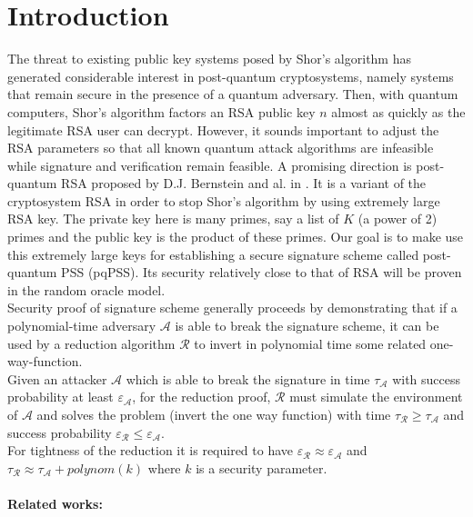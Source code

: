 \documentclass[a4paper,11pt]{article}
\begin{document}
\section{Introduction}
The threat to existing public key systems posed by Shor's \cite{Shor} algorithm has generated considerable interest in post-quantum cryptosystems, namely systems that remain secure in the presence of a quantum adversary. Then, with quantum computers, Shor's algorithm factors an RSA public key $n$ almost as quickly as the legitimate RSA user can decrypt. However, it sounds important to adjust the RSA parameters so that all known quantum attack algorithms are infeasible while signature and verification remain feasible.  A promising direction is post-quantum RSA proposed by D.J. Bernstein and al. in \cite{pqRSA}. It is a variant of the cryptosystem RSA in order to stop Shor's algorithm by using extremely large RSA key. The private key here is many primes, say a list of $K$ (a power of 2) primes and the public key is the product of these primes. Our goal is to make use this extremely large keys for establishing a secure signature scheme called post-quantum PSS (pqPSS). Its security relatively close to that of RSA will be proven in the random oracle model.\\
Security proof of signature scheme generally proceeds by demonstrating that if a polynomial-time adversary $\mathcal{A}$ is able to break the signature scheme, it can be used by a reduction algorithm $\mathcal{R}$ to invert in polynomial time some related one-way-function.\\
Given an attacker $\mathcal{A}$  which is able to break the signature in time $\tau_\mathcal{A}$ with success probability at least $\varepsilon_\mathcal{A}$, for the reduction proof, $\mathcal{R}$  must simulate the environment of $\mathcal{A}$ and solves the problem (invert the one way function) with time $\tau_\mathcal{R} \geq  \tau_\mathcal{A} $ and success probability
$\varepsilon_\mathcal{R} \leq \varepsilon_\mathcal{A}$.\\
For tightness of the reduction it is required to have $\varepsilon_\mathcal{R} \approx \varepsilon_\mathcal{A}$ and $\tau_\mathcal{R} \approx \tau_\mathcal{A} + polynom(k)$ where $k$ is a security parameter.
\paragraph{Related works:}
\end{document}
